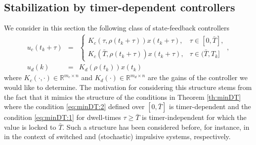 \documentclass[12pt]{article}
\begin{document}
\subsection{Stabilization by timer-dependent controllers}\label{sec:stabz:minDT}

We consider in this section the following class of state-feedback controllers
\begin{equation}\label{eq:K_MDT}
\begin{array}{rcl}
  u_c(t_k+\tau)&=&\left\{\begin{array}{ll}
    K_c(\tau,\rho(t_k+\tau))x(t_k+\tau),& \tau\in[0,\bar T],\\[0.1em]
    K_c(\bar T,\rho(t_k+\tau))x(t_k+\tau),& \tau\in(\bar T,T_k]
    \end{array}\right.,\\[1em]
  u_d(k)&=&K_d(\rho(t_k))x(t_k)
\end{array}
\end{equation}
where $K_c(\cdot,\cdot)\in\mathbb{R}^{m_c\times n}$ and $K_d(\cdot)\in\mathbb{R}^{m_d\times n}$ are the gains of the controller we would like to determine. The motivation for considering this structure stems from the fact that it mimics the structure of the conditions in Theorem \ref{th:minDT} where the condition \eqref{eq:minDT:2} defined over $[0,\bar T]$ is timer-dependent and the condition \eqref{eq:minDT:1} for dwell-times $\tau\ge\bar T$ is timer-independent for which the value is locked to $\bar T$. Such a structure has been considered before, for instance, in \cite{Allerhand:11,Briat:13d,Briat:14f,Briat:15i} in the context of switched and (stochastic) impulsive systems, respectively.
\end{document}
